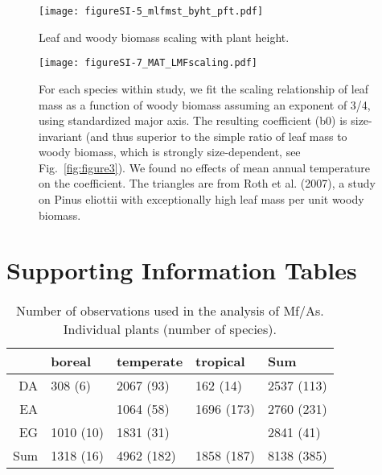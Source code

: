 \documentclass[a4paper]{article}\usepackage[]{graphicx}\usepackage[]{color}
\begin{document}
\begin{figure}[h!]
    \centering
    \texttt{[image: figureSI-5\_mlfmst\_byht\_pft.pdf]}
    \caption{Leaf and woody biomass scaling with plant height.}
    \label{fig:figureSI5}
\end{figure}

\begin{figure}[h!]
    \centering
    \texttt{[image: figureSI-7\_MAT\_LMFscaling.pdf]}
    \caption{For each species within study, we fit the scaling relationship of leaf mass as a function of woody biomass assuming an exponent of 3/4, using standardized major axis. The resulting coefficient (b0) is size-invariant (and thus superior to the simple ratio of leaf mass to woody biomass, which is strongly size-dependent, see Fig.~\ref{fig:figure3}). We found no effects of mean annual temperature on the coefficient. The triangles are from Roth et al. (2007), a study on Pinus eliottii with exceptionally high leaf mass per unit woody biomass.}
    \label{fig:figureSI7}
\end{figure}



\clearpage
\section{Supporting Information Tables}




\begin{table}[ht]
\centering
\caption{Number of observations used in the analysis of Mf/As. Individual plants (number of species).} 
\begin{tabular}{rlll|l}
  & boreal & temperate & tropical & Sum \\ 
  \hline
DA & 308 (6) & 2067 (93) & 162 (14) & 2537 (113) \\ 
  EA &  & 1064 (58) & 1696 (173) & 2760 (231) \\ 
  EG & 1010 (10) & 1831 (31) &  & 2841 (41) \\ 
   \hline
Sum & 1318 (16) & 4962 (182) & 1858 (187) & 8138 (385) \\ 
  \end{tabular}
\end{table}
\end{document}
